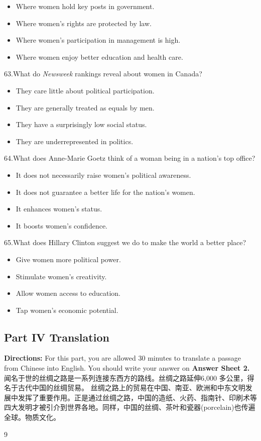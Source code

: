 \documentclass[UTF8,11pt]{ctexart}
\begin{document}
\begin{itemize}[leftmargin=2em,itemsep=.2em,topsep=.4em]\item[A.] Where women hold key posts in government.
\item[B.] Where women’s rights are protected by law.
\item[C.] Where women’s participation in management is high.
\item[D.] Where women enjoy better education and health care.
\end{itemize}

63.What do\textit{ Newsweek} rankings reveal about women in Canada?


\begin{itemize}[leftmargin=2em,itemsep=.2em,topsep=.4em]\item[A.] They care little about political participation.
\item[B.] They are generally treated as equals by men.
\item[C.] They have a surprisingly low social status.
\item[D.] They are underrepresented in politics.
\end{itemize}

64.What does Anne-Marie Goetz think of a woman being in a nation’s top office?


\begin{itemize}[leftmargin=2em,itemsep=.2em,topsep=.4em]\item[A.] It does not necessarily raise women’s political awareness.
\item[B.] It does not guarantee a better life for the nation’s women.
\item[C.] It enhances women’s status.
\item[D.] It boosts women’s confidence.
\end{itemize}

65.What does Hillary Clinton suggest we do to make the world a better place?


\begin{itemize}[leftmargin=2em,itemsep=.2em,topsep=.4em]\item[A.] Give women more political power.
\item[B.] Stimulate women’s creativity.
\item[C.] Allow women access to education.
\item[D.] Tap women’s economic potential.
\end{itemize}

\subsection*{\textbf{Part IV} \textbf{Translation}}


\textbf{Directions:} For this part, you are allowed 30 minutes to translate a passage from Chinese into English. You should write your answer on\textbf{ Answer Sheet 2.} 闻名于世的丝绸之路是一系列连接东西方的路线。丝绸之路延伸6,000 多公里，得名于古代中国的丝绸贸易。 丝绸之路上的贸易在中国、南亚、欧洲和中东文明发展中发挥了重要作用。正是通过丝绸之路，中国的造纸、火药、指南针、印刷术等四大发明才被引介到世界各地。同样，中国的丝绸、茶叶和瓷器(porcelain)也传遍全球。物质文化。


9
\end{document}
